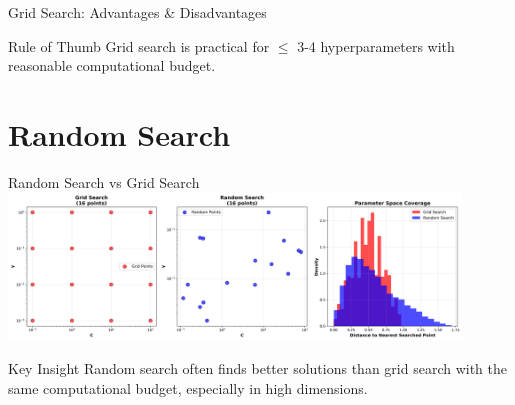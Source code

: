 \documentclass[8pt,aspectratio=1610]{beamer}
\begin{document}
\begin{frame}{Grid Search: Advantages \& Disadvantages}
\begin{alertblock}{Rule of Thumb}
Grid search is practical for $\leq$ 3-4 hyperparameters with reasonable computational budget.
\end{alertblock}
\end{frame}


\section{Random Search}

\begin{frame}{Random Search vs Grid Search}
\centering
\includegraphics[width=0.9\textwidth]{../figures/random_vs_grid_search.png}

\vspace{0.3cm}

\begin{alertblock}{Key Insight}
Random search often finds better solutions than grid search with the same computational budget, especially in high dimensions.
\end{alertblock}
\end{frame}
\end{document}
